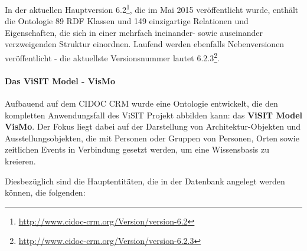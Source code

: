 In der aktuellen Hauptversion 6.2\footnote{\url{http://www.cidoc-crm.org/Version/version-6.2}}, die im Mai 2015 veröffentlicht wurde, enthält die Ontologie 89 RDF Klassen und 149 einzigartige Relationen und Eigenschaften, die sich in einer mehrfach ineinander- sowie auseinander verzweigenden Struktur einordnen. Laufend werden ebenfalls Nebenversionen veröffentlicht - die aktuellste Versionsnummer lautet 6.2.3\footnote{\url{http://www.cidoc-crm.org/Version/version-6.2.3}}.

\paragraph{Das ViSIT Model - VisMo}

Aufbauend auf dem CIDOC CRM wurde eine Ontologie entwickelt, die den kompletten Anwendungsfall des ViSIT Projekt abbilden kann: das \textbf{ViSIT Model VisMo}. Der Fokus liegt dabei auf der Darstellung von Architektur-Objekten und Ausstellungsobjekten, die mit Personen oder Gruppen von Personen, Orten sowie zeitlichen Events in Verbindung gesetzt werden, um eine Wissensbasis zu kreieren.

Diesbezüglich sind die Hauptentitäten, die in der \visit Datenbank angelegt werden können, die folgenden:

